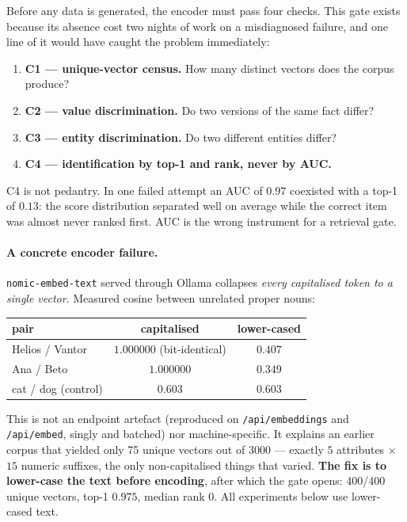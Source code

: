 \documentclass[11pt,a4paper]{article}
\begin{document}
Before any data is generated, the encoder must pass four checks. This gate exists because its absence
cost two nights of work on a misdiagnosed failure, and one line of it would have caught the problem
immediately:

\begin{enumerate}
\item \textbf{C1 --- unique-vector census.} How many distinct vectors does the corpus produce?
\item \textbf{C2 --- value discrimination.} Do two versions of the same fact differ?
\item \textbf{C3 --- entity discrimination.} Do two different entities differ?
\item \textbf{C4 --- identification by top-1 and rank, never by AUC.}
\end{enumerate}

C4 is not pedantry. In one failed attempt an AUC of $0.97$ coexisted with a top-1 of $0.13$: the
score distribution separated well on average while the correct item was almost never ranked first.
AUC is the wrong instrument for a retrieval gate.

\paragraph{A concrete encoder failure.} \texttt{nomic-embed-text} served through Ollama collapses
\emph{every capitalised token to a single vector}. Measured cosine between unrelated proper nouns:

\begin{center}
\begin{tabular}{lcc}
\toprule
pair & capitalised & lower-cased \\
\midrule
Helios / Vantor & $\mathbf{1.000000}$ (bit-identical) & $0.407$ \\
Ana / Beto      & $\mathbf{1.000000}$                 & $0.349$ \\
cat / dog (control) & $0.603$                         & $0.603$ \\
\bottomrule
\end{tabular}
\end{center}

This is not an endpoint artefact (reproduced on \texttt{/api/embeddings} and \texttt{/api/embed},
singly and batched) nor machine-specific. It explains an earlier corpus that yielded only 75 unique
vectors out of 3000 --- exactly $5$ attributes $\times$ $15$ numeric suffixes, the only non-capitalised
things that varied. \textbf{The fix is to lower-case the text before encoding}, after which the gate
opens: 400/400 unique vectors, top-1 $0.975$, median rank $0$. All experiments below use lower-cased
text.
\end{document}
